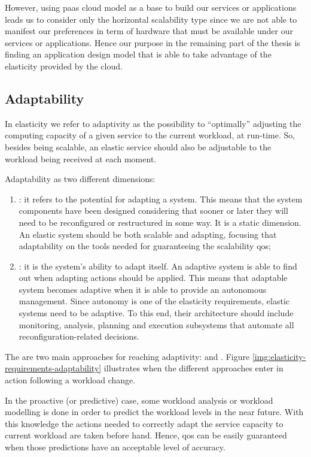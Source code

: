 However, using \ac{paas} cloud model as a base to build our services or applications leads us to consider
only the horizontal scalability type since we are not able to manifest our preferences in term of hardware
that must be available under our services or applications. Hence our purpose in the remaining part of the
thesis is finding an application design model that is able to take advantage of the elasticity
provided by the cloud.

\subsection*{Adaptability}
\label{sec:elasticity-requirements-adaptability}
In elasticity we refer to adaptivity as the possibility to ``optimally'' adjusting the computing capacity
of a given service to the current workload, at run-time. So, besides being scalable, an elastic service
should also be adjustable to the workload being received at each moment.

Adaptability as two different dimensions:

\begin{enumerate}
	\item{: it refers to the potential for adapting a system. This means that the
		system components have been designed considering that sooner or later they will need to be
		reconfigured or restructured in some way. It is a static dimension. An elastic system should be
		both scalable and adapting, focusing that adaptability on the tools needed for guaranteeing the
		scalability \ac{qos};}
	\item{: it is the system's ability to adapt itself. An adaptive system is able
		to find out when adapting actions should be applied. This means that adaptable system becomes
		adaptive when it is able to provide an autonomous management. Since autonomy is one of the
		elasticity requirements, elastic systems need to be adaptive. To this end, their architecture
		should include monitoring, analysis, planning and execution subsystems that automate all
		reconfiguration-related decisions.}
\end{enumerate}

The are two main approaches for reaching adaptivity:  and .
Figure \ref{img:elasticity-requirements-adaptability} illustrates when the different approaches
enter in action following a workload change.

In the proactive (or predictive) case, some workload analysis or workload modelling is done in order
to predict the workload levels in the near future. With this knowledge the actions needed to correctly
adapt the service capacity to current workload are taken before hand. Hence, \ac{qos} can be easily
guaranteed when those predictions have an acceptable level of accuracy.

